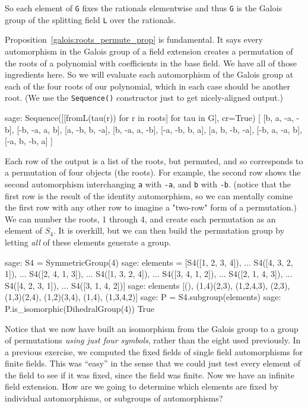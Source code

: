 %
So each element of \verb?G? fixes the rationals elementwise and thus \verb?G? is the Galois group of the splitting field \verb?L? over the rationals.\par
%
Proposition~\ref{galois:roots_permute_prop} is fundamental.  It says every automorphism in the Galois group of a field extension creates a permutation of the roots of a polynomial with coefficients in the base field.  We have all of those ingredients here.  So we will evaluate each automorphism of the Galois group at each of the four roots of our polynomial, which in each case should be another root.  (We use the \verb?Sequence()? constructor just to get nicely-aligned output.)
%
\begin{sageexample}
sage: Sequence([[fromL(tau(r)) for r in roots] for tau in G], cr=True)
[
[b, a, -a, -b],
[-b, -a, a, b],
[a, -b, b, -a],
[b, -a, a, -b],
[-a, -b, b, a],
[a, b, -b, -a],
[-b, a, -a, b],
[-a, b, -b, a]
]
\end{sageexample}
%
Each row of the output is a list of the roots, but permuted, and so corresponds to a permutation of four objects (the roots).  For example, the second row shows the second automorphism interchanging \verb?a? with \verb?-a?, and \verb?b? with \verb?-b?.  (notice that the first row is the result of the identity automorphism, so we can mentally comine the first row with any other row to imagine a "two-row" form of a permutation.)  We can number the roots, 1 through 4, and create each permutation as an element of $S_4$.  It is overkill, but we can then build the permutation group by letting \emph{all} of these elements generate a group.
%
\begin{sageexample}
sage: S4 = SymmetricGroup(4)
sage: elements = [S4([1, 2, 3, 4]),
...               S4([4, 3, 2, 1]),
...               S4([2, 4, 1, 3]),
...               S4([1, 3, 2, 4]),
...               S4([3, 4, 1, 2]),
...               S4([2, 1, 4, 3]),
...               S4([4, 2, 3, 1]),
...               S4([3, 1, 4, 2])]
sage: elements
[(), (1,4)(2,3), (1,2,4,3), (2,3), (1,3)(2,4),
 (1,2)(3,4), (1,4), (1,3,4,2)]
sage: P = S4.subgroup(elements)
sage: P.is_isomorphic(DihedralGroup(4))
True
\end{sageexample}
%
Notice that we now have built an isomorphism from the Galois group to a group of permutations \emph{using just four symbols}, rather than the eight used previously.
%
%
In a previous exercise, we computed the fixed fields of single field automorphisms for finite fields.  This was ``easy'' in the sense that we could just test every element of the field to see if it was fixed, since the field was finite.  Now we have an infinite field extension.  How are we going to determine which elements are fixed by individual automorphisms, or subgroups of automorphisms?\par
